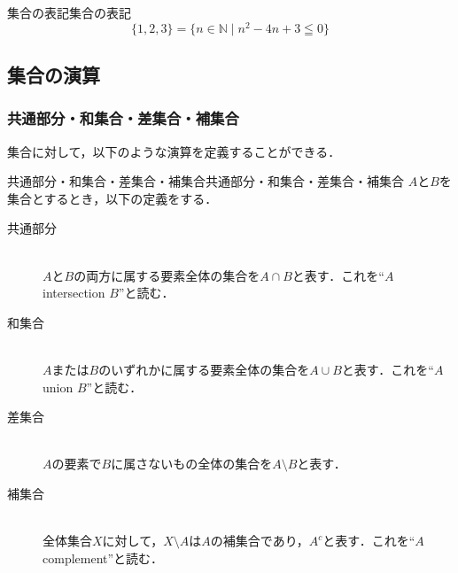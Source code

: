 \documentclass[a4paper,11pt]{ltjsarticle}
\begin{document}
      
        \begin{example}{集合の表記}{集合の表記}
          \[
          \{ 1,2,3 \} = \{ n \in \mathbb{N} \mid  n^2 -4n +3 \leqq 0 \}
          \]
        \end{example}
      
        \subsection{集合の演算}
        
        \subsubsection{共通部分・和集合・差集合・補集合}
        集合に対して，以下のような演算を定義することができる．
        
        \begin{definition}{共通部分・和集合・差集合・補集合}{共通部分・和集合・差集合・補集合}
            $A$と$B$を集合とするとき，以下の定義をする．
            \begin{description}
              \item[共通部分] \mbox{}\\
              $A$と$B$の両方に属する要素全体の集合を$A \cap B$と表す．これを``$A$ intersection $B$''と読む．
              \item[和集合] \mbox{} \\
              $A$または$B$のいずれかに属する要素全体の集合を$A \cup B$と表す．これを``$A$ union $B$''と読む．
              \item[差集合]\mbox{}\\
              $A$の要素で$B$に属さないもの全体の集合を$A \setminus B$と表す．
              \item[補集合] \mbox{}\\
              全体集合$X$に対して，$X \setminus A$は$A$の補集合であり，$A^c$と表す．これを``$A$ complement''と読む．
            \end{description}
        \end{definition}
        
\end{document}

